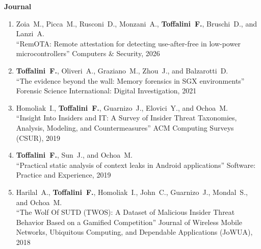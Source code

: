\textbf{Journal}\begin{enumerate}[leftmargin=5mm]
\item[J5] Zoia~M., Picca~M., Rusconi~D., Monzani~A., \textbf{Toffalini~F.}, Bruschi~D., and Lanzi~A.\\``RemOTA: Remote attestation for detecting use-after-free in low-power microcontrollers'' Computers & Security, 2026 
\item[J4] \textbf{Toffalini~F.}, Oliveri~A., Graziano~M., Zhou~J., and Balzarotti~D.\\``The evidence beyond the wall: Memory forensics in SGX environments'' Forensic Science International: Digital Investigation, 2021 
\item[J3] Homoliak~I., \textbf{Toffalini~F.}, Guarnizo~J., Elovici~Y., and Ochoa~M.\\``Insight Into Insiders and IT: A Survey of Insider Threat Taxonomies, Analysis, Modeling, and Countermeasures'' ACM Computing Surveys (CSUR), 2019 
\item[J2] \textbf{Toffalini~F.}, Sun~J., and Ochoa~M.\\``Practical static analysis of context leaks in Android applications'' Software: Practice and Experience, 2019 
\item[J1] Harilal~A., \textbf{Toffalini~F.}, Homoliak~I., John~C., Guarnizo~J., Mondal~S., and Ochoa~M.\\``The Wolf Of SUTD (TWOS): A Dataset of Malicious Insider Threat Behavior Based on a Gamified Competition'' Journal of Wireless Mobile Networks, Ubiquitous Computing, and Dependable Applications (JoWUA), 2018 
\end{enumerate}
